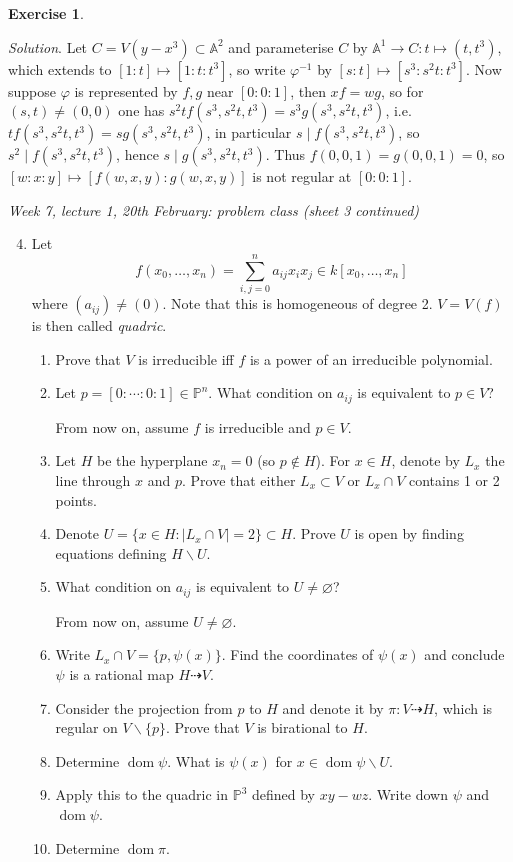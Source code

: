 \documentclass{article}
\newcommand{\A}{\mathbb{A}}
\newcommand{\p}{\mathbb{P}}
\newcommand{\dom}{\operatorname{dom}}
\theoremstyle{definition}
\newtheorem{exe}[defn]{Exercise}
\begin{document}
\begin{exe}
\begin{enumerate}
\textit{Solution}. Let $C=V(y-x^3)\subset\A^2$ and parameterise $C$ by $\A^1\rightarrow C:t\mapsto (t,t^3)$, which extends to $[1:t]\mapsto [1:t:t^3]$, so write $\varphi^{-1}$ by $[s:t]\mapsto [s^3:s^2t:t^3]$. Now suppose $\varphi$ is represented by $f,g$ near $[0:0:1]$, then $xf=wg$, so for $(s,t)\neq (0,0)$ one has $s^2tf(s^3,s^2t,t^3)=s^3g(s^3,s^2t,t^3)$, i.e. $tf(s^3,s^2t,t^3)=sg(s^3,s^2t,t^3)$, in particular $s\mid f(s^3,s^2t,t^3)$, so $s^2\mid f(s^3,s^2t,t^3)$, hence $s\mid g(s^3,s^2t,t^3)$. Thus $f(0,0,1)=g(0,0,1)=0$, so $[w:x:y]\mapsto [f(w,x,y):g(w,x,y)]$ is not regular at $[0:0:1]$.
\end{enumerate}

\begin{flushright}
\textit{Week 7, lecture 1, 20th February: problem class (sheet 3 continued)}
\end{flushright}

\begin{enumerate}
\setcounter{enumi}{3}
\item Let
\[
f(x_0,\ldots,x_n)=\sum_{i,j=0}^n a_{ij}x_ix_j\in k[x_0,\ldots,x_n]
\]
where $(a_{ij})\neq (0)$. Note that this is homogeneous of degree 2. $V=V(f)$ is then called \textit{quadric}.
\begin{enumerate}
\item Prove that $V$ is irreducible iff $f$ is a power of an irreducible polynomial.
\item Let $p=[0:\cdots:0:1]\in\p^n$. What condition on $a_{ij}$ is equivalent to $p\in V$?

From now on, assume $f$ is irreducible and $p\in V$.

\item Let $H$ be the hyperplane $x_n=0$ (so $p\notin H$). For $x\in H$, denote by $L_x$ the line through $x$ and $p$. Prove that either $L_x\subset V$ or $L_x\cap V$ contains 1 or 2 points.
\item Denote $U=\{x\in H:|L_x\cap V|=2\}\subset H$. Prove $U$ is open by finding equations defining $H\backslash U$.
\item What condition on $a_{ij}$ is equivalent to $U\neq\varnothing$?

From now on, assume $U\neq\varnothing$.

\item Write $L_x\cap V=\{p,\psi(x)\}$. Find the coordinates of $\psi(x)$ and conclude $\psi$ is a rational map $H\dashrightarrow V$.
\item Consider the projection from $p$ to $H$ and denote it by $\pi:V\dashrightarrow H$, which is regular on $V\backslash\{p\}$. Prove that $V$ is birational to $H$.
\item Determine $\dom\psi$. What is $\psi(x)$ for $x\in\dom\psi\backslash U$.
\item Apply this to the quadric in $\p^3$ defined by $xy-wz$. Write down $\psi$ and $\dom\psi$.
\item Determine $\dom\pi$.
\end{enumerate}


\end{enumerate}
\end{exe}
\end{document}
